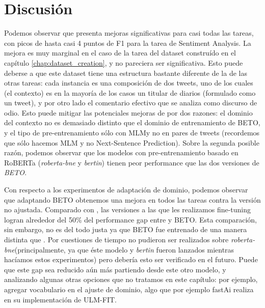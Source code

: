 \section{Discusión}

Podemos observar que \robertuito{} presenta mejoras significativas para casi todas las tareas, con picos de hasta casi 4 puntos de F1 para la tarea de Sentiment Analysis. La mejora es muy marginal en el caso de la tarea del dataset construído en el capítulo \ref{chap:dataset_creation}, y no pareciera ser significativa. Esto puede deberse a que este dataset tiene una estructura bastante diferente de la de las otras tareas: cada instancia es una composición de dos tweets, uno de los cuales (el contexto) es en la mayoría de los casos un titular de diarios (formulado como un tweet), y por otro lado el comentario efectivo que se analiza como discurso de odio. Esto puede mitigar las potenciales mejoras de \robertuito{} por dos razones: el dominio del contexto no es demasiado distinto que el dominio de entrenamiento de BETO, y el tipo de pre-entrenamiento sólo con MLMy no en pares de tweets (recordemos que sólo hacemos MLM y no Next-Sentence Prediction). Sobre la segunda posible razón, podemos observar que los modelos con pre-entrenamiento basado en RoBERTa (\emph{roberta-bne} y \emph{bertin}) tienen peor performance que las dos versiones de \emph{BETO}.

Con respecto a los experimentos de adaptación de dominio, podemos observar que adaptando BETO obtenemos una mejora en todos las tareas contra la versión no ajustada. Comparado con \robertuito{}, las versiones a las que les realizamos fine-tuning logran alrededor del 50\% del performance gap entre \robertuito{} y BETO. Esta comparación, sin embargo, no es del todo justa ya que BETO fue entrenado de una manera distinta que \robertuito{}. Por cuestiones de tiempo no pudieron ser realizados sobre \emph{roberta-bne}(principalmente, ya que éste modelo y \emph{bertin} fueron lanzados mientras hacíamos estos experimentos) pero debería esto ser verificado en el futuro. Puede que este gap sea reducido aún más partiendo desde este otro modelo, y analizando algunas otras opciones que no tratamos en este capítulo: por ejemplo, agregar vocabulario en el ajuste de dominio, algo que por ejemplo fastAi realiza en su implementación de ULM-FIT.

